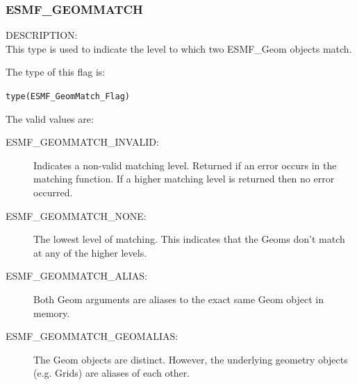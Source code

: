 
\subsubsection{ESMF\_GEOMMATCH}
\label{const:geommatch}

{\sf DESCRIPTION:\\}
 This type is used to indicate the level to which two ESMF\_Geom objects match.

The type of this flag is:

{\tt type(ESMF\_GeomMatch\_Flag)}

The valid values are:
\begin{description}
\item [ESMF\_GEOMMATCH\_INVALID:] Indicates a non-valid matching level. Returned
      if an error occurs in the matching function. If a higher matching level
      is returned then no error occurred.
\item [ESMF\_GEOMMATCH\_NONE:] The lowest level of matching. 
      This indicates that the Geoms don't match at any of the higher levels. 
\item [ESMF\_GEOMMATCH\_ALIAS:] Both Geom arguments are aliases to the exact
      same Geom object in memory.
\item [ESMF\_GEOMMATCH\_GEOMALIAS:] The Geom objects are distinct. However, the underlying geometry
      objects (e.g. Grids) are aliases of each other. 
\end{description}


